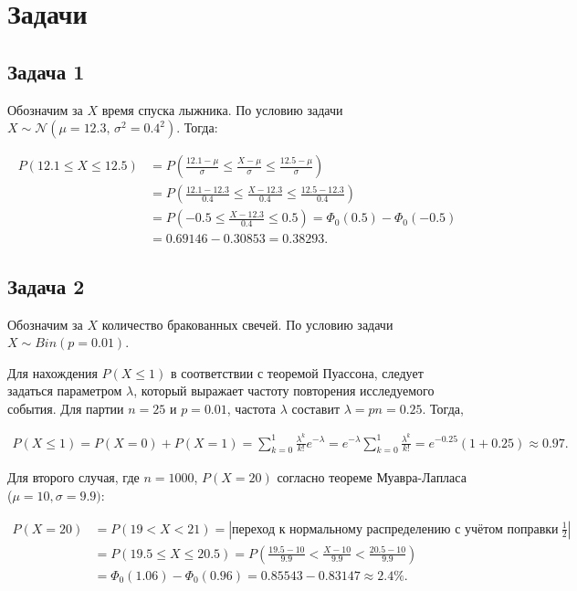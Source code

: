 \documentclass[a4paper,11pt]{article}
\begin{document}
\section{Задачи}

\subsection{Задача 1}

Обозначим за $X$ время спуска лыжника. По условию задачи $X \sim \mathcal{N}(\mu = 12.3,\,\sigma^{2} = 0.4^2)$. Тогда:

\begin{align*}
P(12.1 \leq X \leq 12.5) 
& = P(\frac{12.1-\mu}{\sigma} \leq \frac{X - \mu}{\sigma} \leq \frac{12.5-\mu}{\sigma}) \\
& = P(\frac{12.1-12.3}{0.4} \leq \frac{X - 12.3}{0.4} \leq \frac{12.5-12.3}{0.4}) \\
& = P(-0.5 \leq \frac{X - 12.3}{0.4} \leq 0.5) = \Phi_0(0.5) - \Phi_0(-0.5) \\
& = 0.69146 - 0.30853 = 0.38293.
\end{align*}

\subsection{Задача 2}

Обозначим за $X$ количество бракованных свечей. По условию задачи $X \sim Bin(p = 0.01)$.

\medskip

Для нахождения $P(X \leq 1)$ в соответствии с теоремой Пуассона, следует задаться параметром $\lambda$, который выражает частоту повторения исследуемого события. Для партии $n = 25$ и $p = 0.01$, частота $\lambda$ составит $\lambda = pn = 0.25$. Тогда,

\begin{align*}
P(X \leq 1) = P(X=0) + P(X=1) = \sum_{k=0}^{1}\frac{\lambda^k}{k!}e^{-\lambda}
= e^{-\lambda}\sum_{k=0}^{1}\frac{\lambda^k}{k!} = e^{-0.25}(1 + 0.25) \approx 0.97.
\end{align*}

\medskip

Для второго случая, где $n = 1000$, $P(X = 20)$ согласно теореме Муавра-Лапласа ($\mu = 10, \sigma = 9.9)$:

\begin{align*}
P(X = 20) & = P(19 < X < 21) = |\text{переход к нормальному распределению с учётом поправки}\ \frac{1}{2}| \\ 
& = P(19.5 \leq X \leq 20.5) = P(\frac{19.5-10}{9.9} < \frac{X-10}{9.9} < \frac{20.5-10}{9.9}) \\
& = \Phi_0(1.06) - \Phi_0(0.96) = 0.85543 - 0.83147 \approx 2.4\%.
\end{align*}
\end{document}
